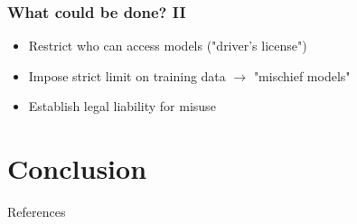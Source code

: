 \documentclass[
	11pt, compress%
]{beamer}
\begin{document}
\begin{frame}
	\frametitle{What could be done? II}
	\begin{itemize}
		\setlength\itemsep{1,5em}
		\item Restrict who can access models ("driver's license")
		\item Impose strict limit on training data $\rightarrow$ "mischief models"
		\item Establish legal liability for misuse
	\end{itemize}
\end{frame}

\section{Conclusion}


\begin{frame}[allowframebreaks]{References} 
    \nocite{*}
	\tiny
    
    
\end{frame}


\end{document}
